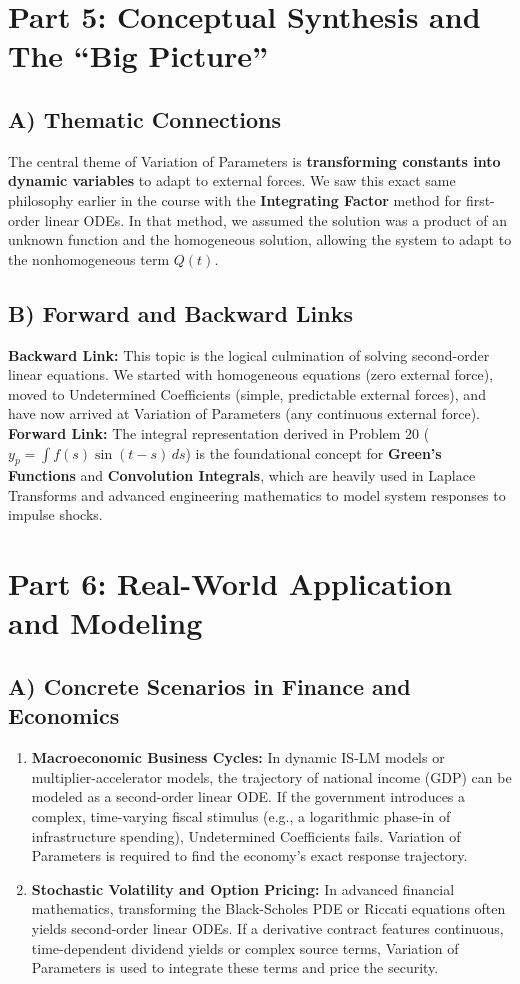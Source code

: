 \documentclass{article}
\begin{document}
\section{Part 5: Conceptual Synthesis and The ``Big Picture''}

\subsection{A) Thematic Connections}
The central theme of Variation of Parameters is \textbf{transforming constants into dynamic variables} to adapt to external forces. We saw this exact same philosophy earlier in the course with the \textbf{Integrating Factor} method for first-order linear ODEs. In that method, we assumed the solution was a product of an unknown function and the homogeneous solution, allowing the system to adapt to the nonhomogeneous term $Q(t)$. 

\subsection{B) Forward and Backward Links}
\textbf{Backward Link:} This topic is the logical culmination of solving second-order linear equations. We started with homogeneous equations (zero external force), moved to Undetermined Coefficients (simple, predictable external forces), and have now arrived at Variation of Parameters (any continuous external force).
\textbf{Forward Link:} The integral representation derived in Problem 20 ($y_p = \int f(s)\sin(t-s) \, ds$) is the foundational concept for \textbf{Green's Functions} and \textbf{Convolution Integrals}, which are heavily used in Laplace Transforms and advanced engineering mathematics to model system responses to impulse shocks.

\section{Part 6: Real-World Application and Modeling}

\subsection{A) Concrete Scenarios in Finance and Economics}
\begin{enumerate}
    \item \textbf{Macroeconomic Business Cycles:} In dynamic IS-LM models or multiplier-accelerator models, the trajectory of national income (GDP) can be modeled as a second-order linear ODE. If the government introduces a complex, time-varying fiscal stimulus (e.g., a logarithmic phase-in of infrastructure spending), Undetermined Coefficients fails. Variation of Parameters is required to find the economy's exact response trajectory.
    \item \textbf{Stochastic Volatility and Option Pricing:} In advanced financial mathematics, transforming the Black-Scholes PDE or Riccati equations often yields second-order linear ODEs. If a derivative contract features continuous, time-dependent dividend yields or complex source terms, Variation of Parameters is used to integrate these terms and price the security.
\end{enumerate}
\end{document}
